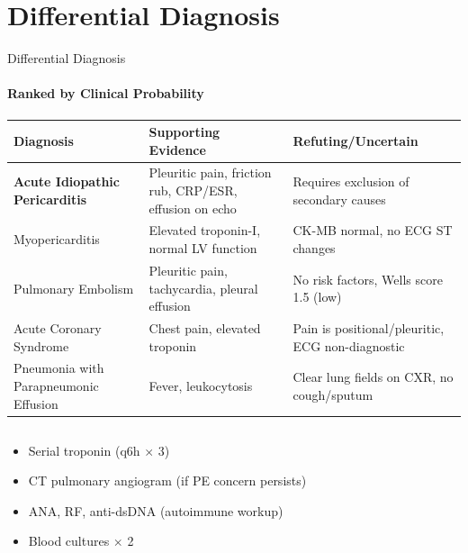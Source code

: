 \section{Differential Diagnosis}
\begin{frame}{Differential Diagnosis}
  \framesubtitle{Ranked by Clinical Probability}

  \begin{tcolorbox}[infobox,title={\faBalanceScale\hspace{4pt}Diagnostic Assessment}]
    \small
    \renewcommand{\arraystretch}{1.35}
    \begin{tabular}{@{}>{\raggedright\arraybackslash}p{}>{\raggedright\arraybackslash}p{}>{\raggedright\arraybackslash}p{}@{}}
      \toprule
      \textbf{Diagnosis} & \textbf{Supporting Evidence} & \textbf{Refuting/Uncertain} \\
      \midrule
      \textbf{Acute Idiopathic Pericarditis} & Pleuritic pain, friction rub, CRP/ESR, effusion on echo & Requires exclusion of secondary causes \\
      Myopericarditis & Elevated troponin-I, normal LV function & CK-MB normal, no ECG ST changes \\
      Pulmonary Embolism & Pleuritic pain, tachycardia, pleural effusion & No risk factors, Wells score 1.5 (low) \\
      Acute Coronary Syndrome & Chest pain, elevated troponin & Pain is positional/pleuritic, ECG non-diagnostic \\
      Pneumonia with Parapneumonic Effusion & Fever, leukocytosis & Clear lung fields on CXR, no cough/sputum \\
      \bottomrule
    \end{tabular}
  \end{tcolorbox}

  \vspace{0.3cm}

  \begin{columns}[T]
    \begin{tcolorbox}[alertbox,title={\faExclamationCircle\hspace{4pt}Pending Studies}]
      \small
      \begin{itemize}
        \item Serial troponin (q6h $\times$ 3)
        \item CT pulmonary angiogram (if PE concern persists)
        \item ANA, RF, anti-dsDNA (autoimmune workup)
        \item Blood cultures $\times$ 2
      \end{itemize}
    \end{tcolorbox}


\end{columns}
\end{frame}
